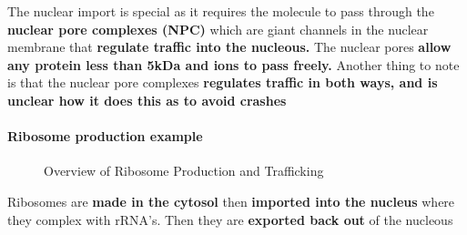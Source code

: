 \documentclass[../main.tex]{subfiles}
\begin{document}
The nuclear import is special as it requires the molecule to pass through the \textbf{nuclear pore complexes (\gls{NPC})} which are giant channels in the nuclear membrane that \textbf{regulate traffic into the nucleous.}  The nuclear pores \textbf{allow any protein less than 5kDa and ions to pass freely.} Another thing to note is that the nuclear pore complexes \textbf{regulates traffic in both ways, and is unclear how it does this as to avoid crashes}

\paragraph{Ribosome production example}

\begin{figure}[H]
\centering
{}
\caption{Overview of Ribosome Production and Trafficking}
\end{figure}
Ribosomes are \textbf{made in the cytosol} then \textbf{imported into the nucleus } where they complex with rRNA's. Then they are \textbf{exported back out} of the nucleous
\end{document}
